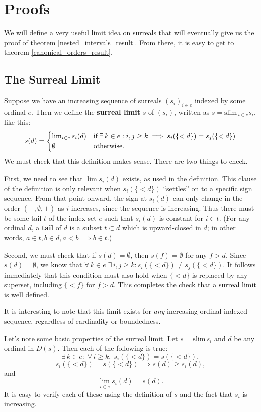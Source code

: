 \documentclass[11pt]{amsart}
\newcommand{\slim}{\mathrm{slim}\,}
\begin{document}
\section{Proofs}

We will define a very useful limit idea on surreals that will eventually give us the proof of theorem \ref{nested_intervals_result}.  From there, it is easy to get to theorem \ref{canonical_orders_result}.

\subsection{The Surreal Limit}

Suppose we have an increasing sequence of surreals $(s_i)_{i\in e}$ indexed by some ordinal $e$.
Then we define the {\bf surreal limit} $s$ of $(s_i)$, written as $s = \slim_{i\in e} s_i$, like this:
\[
    s(d) =
    \begin{cases}
      \lim_{i\in e} s_i(d) & \text{if\;} \exists\, k\in e : i,j\ge k \implies s_i(\{<d\}) = s_j(\{<d\}) \\
      \emptyset  & \text{otherwise.}
    \end{cases}
\]
We must check that this definition makes sense.
There are two things to check.

First, we need to see that $\lim s_i(d)$ exists, as used in the
definition.
This clause of the definition is only relevant when $s_i(\{<d\})$ ``settles'' on to
a specific sign sequence.
From that point onward, the sign at $s_i(d)$ can only change in the
order $(-,\emptyset, +)$ as $i$ increases, since the sequence is increasing.
Thus there must be some tail $t$ of the
index set $e$ such that $s_i(d)$ is constant for $i\in t$.
(For any ordinal $d$, a {\bf tail} of $d$ is a subset $t\subset d$ which is upward-closed in $d$; in other words,
$a\in t, b\in d, a < b \implies b\in t$.)

Second, we must check that if $s(d)=\emptyset$, then $s(f)=\emptyset$ for any $f>d$.  Since
$s(d)=\emptyset$, we know that $\forall\, k\in e \; \exists\, i,j\ge k : s_i(\{<d\}) \ne s_j(\{<d\})$.
It follows immediately that this condition must also hold when $\{<d\}$ is replaced by any
superset, including $\{<f\}$ for $f>d$.  This completes the check that a surreal limit is well defined.

It is interesting to note that this limit exists for {\em any} increasing ordinal-indexed sequence, regardless
of cardinality or boundedness.

Let's note some basic properties of the surreal limit.  Let $s=\slim s_i$ and $d$ be any ordinal in $D(s)$.
Then each of the following is true:
\begin{equation}\label{eqn1}
\exists\, k\in e: \;\forall\, i\ge k,\; s_i(\{<d\}) = s(\{<d\}),
\end{equation}
\begin{equation}\label{eqn2}
s_i(\{<d\}) = s(\{<d\}) \implies s(d)\ge s_i(d),
\end{equation}
and
\begin{equation}\label{eqn3}
\lim_{i\in e} s_i(d) = s(d).
\end{equation}
It is easy to verify each of these using the definition of $s$ and the fact that $s_i$ is increasing.
\end{document}
